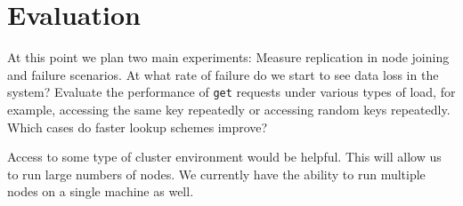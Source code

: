 \documentclass[12pt]{article}
\begin{document}
\section{Evaluation}

At this point we plan two main experiments: Measure replication in node joining and failure scenarios.  At what rate of failure do we start to see data loss in the system?  Evaluate the performance of {\tt get} requests under various types of load, for example, accessing the same key repeatedly or accessing random keys repeatedly.  Which cases do faster lookup schemes improve?  

Access to some type of cluster environment would be helpful.  This will allow us to run large numbers of nodes.  We currently have the ability to run multiple nodes on a single machine as well.
\end{document}
